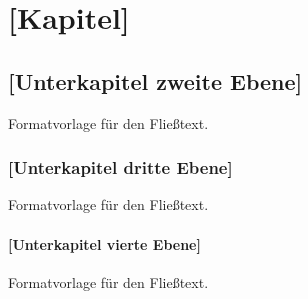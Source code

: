 \chapter{[Kapitel]}

\section{[Unterkapitel zweite Ebene]}
Formatvorlage für den Fließtext.

\subsection{[Unterkapitel dritte Ebene]}
Formatvorlage für den Fließtext.

\subsubsection{[Unterkapitel vierte Ebene]}
Formatvorlage für den Fließtext.
